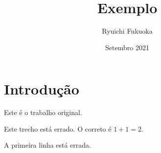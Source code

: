 \documentclass{article}
\title{Exemplo}
\author{Ryuichi Fukuoka}
\date{Setembro 2021}
\begin{document}
\maketitle

\section{Introdução}

\indent

Este é o trabalho original.

Este trecho está errado. O correto é $1+1=2$.

A primeira linha está errada.
\end{document}
